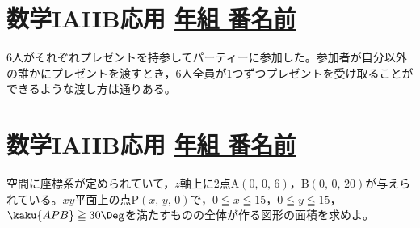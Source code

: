 \documentclass[b5j]{jarticle}
\def\Name#1{\section{\large\bf  #1\hfill
\underline{ \hspace{1zw}年\hspace{2zw}組\hspace{2zw}
番名前\hspace{12zw}}}}
\begin{document}
\newpage



\Name{数学IAIIB応用}
\hakosyokika
6人がそれぞれプレゼントを持参してパーティーに参加した。参加者が自分以外の誰かにプレゼントを渡すとき，6人全員が1つずつプレゼントを受け取ることができるような渡し方は\karaHako 通りある。

\newpage



\Name{数学IAIIB応用}
\hakosyokika
空間に座標系が定められていて，$z$軸上に2点A$(0,\,0,\,6)$，B$(0,\,0,\,20)$が与えられている。$xy$平面上の点P$(x,\,y,\,0)$で，$0\leqq x\leqq 15$，$0\leqq y\leqq 15$，$\kaku{APB}\geqq30\Deg$を満たすものの全体が作る図形の面積を求めよ。

\newpage





\setcounter{section}{0}
\end{document}
